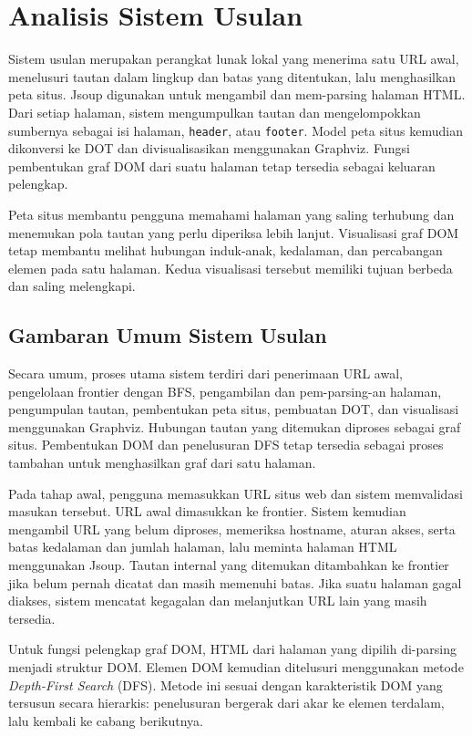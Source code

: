 \section{Analisis Sistem Usulan}
\label{sec:analisis-sistem-usulan}

Sistem usulan merupakan perangkat lunak lokal yang menerima satu URL awal, menelusuri tautan dalam lingkup dan batas yang ditentukan, lalu menghasilkan peta situs. Jsoup digunakan untuk mengambil dan mem-parsing halaman HTML. Dari setiap halaman, sistem mengumpulkan tautan dan mengelompokkan sumbernya sebagai isi halaman, \texttt{header}, atau \texttt{footer}. Model peta situs kemudian dikonversi ke DOT dan divisualisasikan menggunakan Graphviz. Fungsi pembentukan graf DOM dari suatu halaman tetap tersedia sebagai keluaran pelengkap.

Peta situs membantu pengguna memahami halaman yang saling terhubung dan menemukan pola tautan yang perlu diperiksa lebih lanjut. Visualisasi graf DOM tetap membantu melihat hubungan induk-anak, kedalaman, dan percabangan elemen pada satu halaman. Kedua visualisasi tersebut memiliki tujuan berbeda dan saling melengkapi.

\subsection{Gambaran Umum Sistem Usulan}
Secara umum, proses utama sistem terdiri dari penerimaan URL awal, pengelolaan frontier dengan BFS, pengambilan dan pem-parsing-an halaman, pengumpulan tautan, pembentukan peta situs, pembuatan DOT, dan visualisasi menggunakan Graphviz. Hubungan tautan yang ditemukan diproses sebagai graf situs. Pembentukan DOM dan penelusuran DFS tetap tersedia sebagai proses tambahan untuk menghasilkan graf dari satu halaman.

Pada tahap awal, pengguna memasukkan URL situs web dan sistem memvalidasi masukan tersebut. URL awal dimasukkan ke frontier. Sistem kemudian mengambil URL yang belum diproses, memeriksa hostname, aturan akses, serta batas kedalaman dan jumlah halaman, lalu meminta halaman HTML menggunakan Jsoup. Tautan internal yang ditemukan ditambahkan ke frontier jika belum pernah dicatat dan masih memenuhi batas. Jika suatu halaman gagal diakses, sistem mencatat kegagalan dan melanjutkan URL lain yang masih tersedia.

Untuk fungsi pelengkap graf DOM, HTML dari halaman yang dipilih di-parsing menjadi struktur DOM. Elemen DOM kemudian ditelusuri menggunakan metode \textit{Depth-First Search} (DFS). Metode ini sesuai dengan karakteristik DOM yang tersusun secara hierarkis: penelusuran bergerak dari akar ke elemen terdalam, lalu kembali ke cabang berikutnya.


